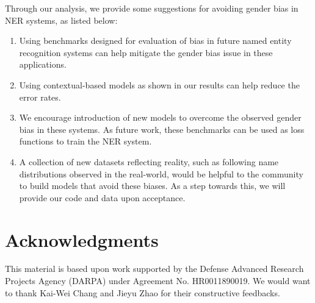 Through our analysis, we provide some suggestions for avoiding gender bias in NER systems, as listed below:
\begin{enumerate}
    \item Using benchmarks designed for evaluation of bias in future named entity recognition systems can help mitigate the gender bias issue in these applications. 
    \item Using contextual-based models as shown in our results can help reduce the error rates.
    \item We encourage introduction of new models to overcome the observed gender bias in these systems. As future work, these benchmarks can be used as loss functions to train the NER system. 
    \item A collection of new datasets reflecting reality, such as following name distributions observed in the real-world, would be helpful to the community to build models that avoid these biases. As a step towards this, we will provide our code and data upon acceptance.
\end{enumerate}

\section{Acknowledgments}
This material is based upon work supported by the Defense Advanced Research Projects Agency (DARPA) under Agreement No. HR0011890019. We would want to thank Kai-Wei Chang and Jieyu Zhao for their constructive feedbacks.




